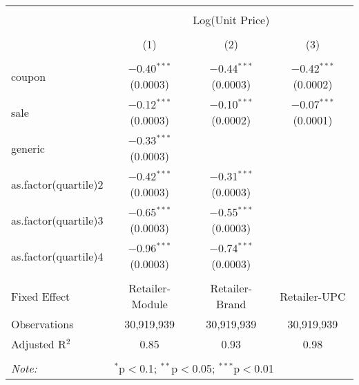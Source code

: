 
\begin{table}[!htbp] \centering 
  \caption{} 
  \label{tab:overallSavingsStorable} 
\begin{tabular}{@{\extracolsep{5pt}}lccc} 
\\[-1.8ex]\hline 
\hline \\[-1.8ex] 
 & \multicolumn{3}{c}{Log(Unit Price)} \\ 
\\[-1.8ex] & (1) & (2) & (3)\\ 
\hline \\[-1.8ex] 
 coupon & $-$0.40$^{***}$ (0.0003) & $-$0.44$^{***}$ (0.0003) & $-$0.42$^{***}$ (0.0002) \\ 
  sale & $-$0.12$^{***}$ (0.0003) & $-$0.10$^{***}$ (0.0002) & $-$0.07$^{***}$ (0.0001) \\ 
  generic & $-$0.33$^{***}$ (0.0003) &  &  \\ 
  as.factor(quartile)2 & $-$0.42$^{***}$ (0.0003) & $-$0.31$^{***}$ (0.0003) &  \\ 
  as.factor(quartile)3 & $-$0.65$^{***}$ (0.0003) & $-$0.55$^{***}$ (0.0003) &  \\ 
  as.factor(quartile)4 & $-$0.96$^{***}$ (0.0003) & $-$0.74$^{***}$ (0.0003) &  \\ 
 \hline \\[-1.8ex] 
Fixed Effect & Retailer-Module & Retailer-Brand & Retailer-UPC \\ 
Observations & 30,919,939 & 30,919,939 & 30,919,939 \\ 
Adjusted R$^{2}$ & 0.85 & 0.93 & 0.98 \\ 
\hline 
\hline \\[-1.8ex] 
\textit{Note:}  & \multicolumn{3}{l}{$^{*}$p$<$0.1; $^{**}$p$<$0.05; $^{***}$p$<$0.01} \\ 
\end{tabular} 
\end{table} 
